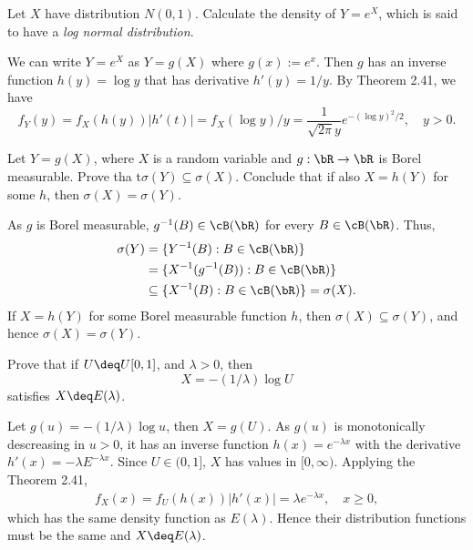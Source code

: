 \begin{exercise}
  Let $X$ have distribution $N(0,1)$. Calculate the density of $Y=e^X$, which is said to have a \textit{log normal distribution}.
\end{exercise}
\begin{solution}
  We can write $Y=e^X$ as $Y=g(X)$ where $g(x):=e^x$. Then $g$ has an inverse function $h(y)=\log y$ that has derivative $h'(y)=1/y$. By Theorem 2.41, we have
  \[
    f_Y(y)=f_X(h(y))|h'(t)| = f_X(\log y)/y = \frac{1}{\sqrt{2\pi}y}e^{-(\log y)^2/2}, \quad y>0.
  \]
\end{solution}


\begin{exercise}
  Let $Y=g(X)$, where $X$ is a random variable and $g:\bR\to\bR$ is Borel measurable. Prove tha t$\sigma(Y)\subseteq\sigma(X)$. Conclude that if also $X=h(Y)$ for some $h$, then $\sigma(X) =\sigma(Y)$.
\end{exercise}
\begin{solution}
  As $g$ is Borel measurable, $g^{-1}(B)\in\cB(\bR)$ for every $B\in\cB(\bR)$. Thus,
  \begin{align*}
    \sigma(Y) &= \{Y^{-1}(B):B\in\cB(\bR)\} \\
      &= \{X^{-1}(g^{-1}(B)):B\in\cB(\bR)\} \\
      &\subseteq \{X^{-1}(B):B\in\cB(\bR)\} = \sigma(X).
  \end{align*}
  If $X=h(Y)$ for some Borel measurable function $h$, then $\sigma(X)\subseteq \sigma(Y)$, and hence $\sigma(X)=\sigma(Y)$.
\end{solution}


\begin{exercise}
  Prove that if $U\deq U[0, 1]$, and $\lambda>0$, then
  \[ X = -(1/\lambda)\log U \]
  satisfies $X\deq E(\lambda)$.
\end{exercise}
\begin{solution}
  Let $g(u)=-(1/\lambda)\log u$, then $X=g(U)$. As $g(u)$ is monotonically descreasing in $u>0$, it has an inverse function $h(x)=e^{-\lambda x}$ with the derivative $h'(x)=-\lambda E^{-\lambda x}$. Since $U\in(0, 1]$, $X$ has values in $[0, \infty)$. Applying the Theorem 2.41,
  \begin{align*}
    f_X(x) = f_U(h(x))|h'(x)| = \lambda e^{-\lambda x}, \quad x\geq 0,
  \end{align*}
  which has the same density function as $E(\lambda)$. Hence their distribution functions must be the same and $X\deq E(\lambda)$.
\end{solution}
